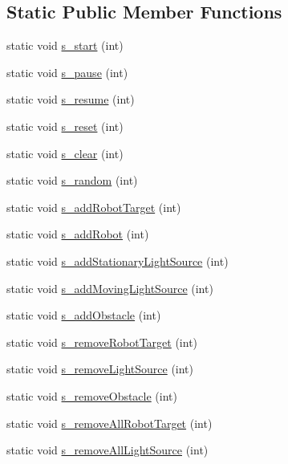 \subsection*{Static Public Member Functions}
\begin{DoxyCompactItemize}
\item 
static void \hyperlink{classSimulation_a4fbdc741b91e30e8ae6660e0df440b0f}{s\-\_\-start} (int)
\item 
static void \hyperlink{classSimulation_a5f23f02ab2ff4908179428b679cd35e0}{s\-\_\-pause} (int)
\item 
static void \hyperlink{classSimulation_a488913a8c9940626ae33fbb46fcaa3ba}{s\-\_\-resume} (int)
\item 
static void \hyperlink{classSimulation_a126696e55171934239ad04f8967868a7}{s\-\_\-reset} (int)
\item 
static void \hyperlink{classSimulation_a8155c197bab91873c70265d50e257108}{s\-\_\-clear} (int)
\item 
static void \hyperlink{classSimulation_abaa6fb8813325571348d49ff8f7d63d1}{s\-\_\-random} (int)
\item 
static void \hyperlink{classSimulation_a8809bedf93cf98b14595606702dac2ea}{s\-\_\-add\-Robot\-Target} (int)
\item 
static void \hyperlink{classSimulation_af58dab21fe89ca343e68143663a4c02b}{s\-\_\-add\-Robot} (int)
\item 
static void \hyperlink{classSimulation_a81fd62337fe6091c4a10277f24d3283e}{s\-\_\-add\-Stationary\-Light\-Source} (int)
\item 
static void \hyperlink{classSimulation_a6712136802456306afa232fc50999494}{s\-\_\-add\-Moving\-Light\-Source} (int)
\item 
static void \hyperlink{classSimulation_ae27ff6c795de81dcffe7f6e0e9b2e056}{s\-\_\-add\-Obstacle} (int)
\item 
static void \hyperlink{classSimulation_a2eac6140af57c80832b96f7baeaa1541}{s\-\_\-remove\-Robot\-Target} (int)
\item 
static void \hyperlink{classSimulation_a4582e4be95ed1c5e6d56b9784c6d445d}{s\-\_\-remove\-Light\-Source} (int)
\item 
static void \hyperlink{classSimulation_ace6392d4941964d55dd015d72cd4d329}{s\-\_\-remove\-Obstacle} (int)
\item 
static void \hyperlink{classSimulation_a44d48e7718d802a3f487728088883062}{s\-\_\-remove\-All\-Robot\-Target} (int)
\item 
static void \hyperlink{classSimulation_a4a93430b4e38ab42ad0484068aa8c7ef}{s\-\_\-remove\-All\-Light\-Source} (int)

\end{DoxyCompactItemize}
